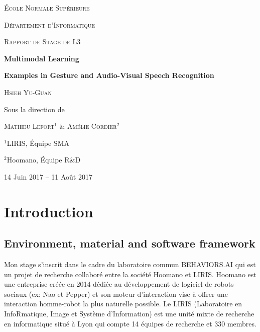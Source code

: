 

\begin{titlepage}

  \centering

  \vspace*{1.5em}
  {\LARGE \scshape École Normale Supérieure \par}
  {\Large \scshape Département d'Informatique \par}

  {\Large \scshape Rapport de Stage de L3 \par}

  \vspace{14em}
  {\huge \bfseries Multimodal Learning \par} 
  {\Large \bfseries
    Examples in Gesture and Audio-Visual Speech Recognition \par}

  \vspace{4em}
  {\Large \scshape Hsieh Yu-Guan \par}
  
  \vspace{2em}
  {\Large Sous la direction de \par}

  \vspace{0.5em}
  {\Large \scshape Mathieu Lefort$^1$ \& Amélie Cordier$^2$ \par}

  \vspace{0.5em}
  {\large $^1$LIRIS, Équipe SMA \par}
  {\large $^2$Hoomano, Équipe R\&D \par}

  \vspace{8em}
  {\Large 14 Juin 2017 -- 11 Août 2017}

  \vfill

\end{titlepage}

\section{Introduction} \label{section:introduction}

\subsection{Environment, material and software framework}

Mon stage s'inscrit dans le cadre du laboratoire commun BEHAVIORS.AI
qui est un projet de recherche collaboré entre la société Hoomano et LIRIS.
Hoomano est une entreprise créée en 2014 dédiée au développement de
logiciel de robots sociaux (ex: Nao et Pepper) et son moteur d'interaction
vise à offrer une interaction homme-robot la plus naturelle possible.
Le LIRIS (Laboratoire en InfoRmatique, Image et Système d'Information)
est une unité mixte de recherche en informatique situé à Lyon qui compte
14 équipes de recherche et 330 membres.

